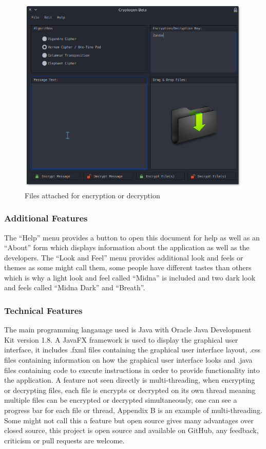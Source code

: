 \documentclass[11pt]{article}
\begin{document}
	\begin{figure}[!htb]
	\centering
	\includegraphics[scale=0.55]{files.png}
	\caption{Files attached for encryption or decryption} %
	\label{fig:files} %
	\end{figure}

\newpage
	\subsubsection{Additional Features}
	The ``Help'' menu provides a button to open this document for help as well as an ``About'' form which displays information about the application as well as the developers. The ``Look and Feel'' menu provides additional look and feels or themes as some might call them, some people have different tastes than others which is why a light look and feel called ``Midna'' is included and two dark look and feels called ``Midna Dark'' and ``Breath''.

	\subsubsection{Technical Features}
	The main programming langauage used is Java with Oracle Java Development Kit version 1.8. A JavaFX framework is used to display the graphical user interface, it includes .fxml files containing the graphical user interface layout, .css files containing information on how the graphical user interface looks and .java files containing code to execute instructions in order to provide functionality into the application. A feature not seen directly is multi-threading, when encrypting or decrypting files, each file is encrypts or decrypted on its own thread meaning multiple files can be encrypted or decrypted simultaneously, one can see a progress bar for each file or thread, Appendix B is an example of multi-threading. Some might not call this a feature but open source gives many advantages over closed source, this project is open source and available on GitHub, any feedback, criticism or pull requests are welcome.
\end{document}
